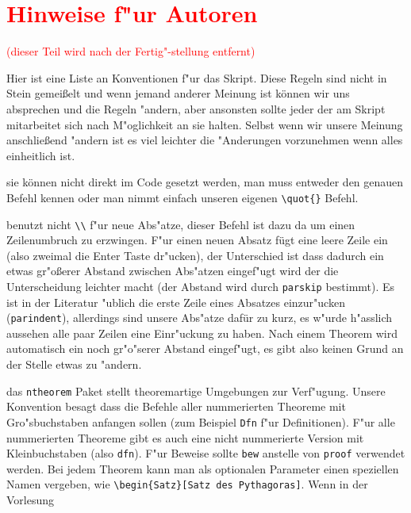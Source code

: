 \documentclass[paper=A4, twoside, chapterprefix=true, bibliography=totoc, headsepline]{scrbook}
\begin{document}
\section*{\textcolor{red}{Hinweise f"ur Autoren}}

\textcolor{red}{(dieser Teil wird nach der Fertig"-stellung entfernt)}

Hier ist eine Liste an Konventionen f"ur das Skript. Diese Regeln sind
nicht in Stein gemei\ss elt und wenn jemand anderer Meinung ist können
wir uns absprechen und die Regeln "andern, aber ansonsten sollte jeder
der am Skript mitarbeitet sich nach M"oglichkeit an sie halten. Selbst
wenn wir unsere Meinung anschließend "andern ist es viel leichter die
"Anderungen vorzunehmen wenn alles einheitlich ist.

\begin{description}[font=\normalfont\itshape]
\item[Anf"uhrungszeichen:] sie können nicht direkt im Code gesetzt
  werden, man muss entweder den genauen Befehl kennen oder man nimmt
  einfach unseren eigenen \verb|\quot{}| Befehl.
\item[Abs"atze:] benutzt nicht \verb|\\| f"ur neue Abs"atze, dieser
  Befehl ist dazu da um einen Zeilenumbruch zu erzwingen. F"ur einen
  neuen Absatz fügt eine leere Zeile ein (also zweimal die Enter Taste
  dr"ucken), der Unterschied ist dass dadurch ein etwas gr"o\ss erer
  Abstand zwischen Abs"atzen eingef"ugt wird der die Unterscheidung
  leichter macht (der Abstand wird durch \verb|parskip| bestimmt). Es
  ist in der Literatur "ublich die erste Zeile eines Absatzes
  einzur"ucken (\verb|parindent|), allerdings sind unsere Abs"atze
  dafür zu kurz, es w"urde h"asslich aussehen alle paar Zeilen eine
  Einr"uckung zu haben. Nach einem Theorem wird automatisch ein noch
  gr"o"serer Abstand eingef"ugt, es gibt also keinen Grund an der
  Stelle etwas zu "andern.
\item[Theoreme:] das \verb|ntheorem| Paket stellt theoremartige
  Umgebungen zur Verf"ugung. Unsere Konvention besagt dass die Befehle
  aller nummerierten Theoreme mit Gro"sbuchstaben anfangen sollen (zum
  Beispiel \verb|Dfn| f"ur Definitionen). F"ur alle nummerierten
  Theoreme gibt es auch eine nicht nummerierte Version mit
  Kleinbuchstaben (also \verb|dfn|). F"ur Beweise sollte \verb|bew|
  anstelle von \verb|proof| verwendet werden. Bei jedem Theorem kann
  man als optionalen Parameter einen speziellen Namen vergeben, wie
  \verb|\begin{Satz}[Satz des Pythagoras]|. Wenn in der Vorlesung

\end{description}
\end{document}
